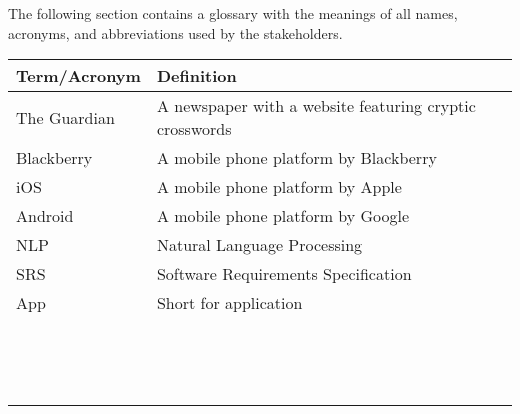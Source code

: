 
The following section contains a glossary with the meanings of all names, acronyms, and abbreviations used by the stakeholders.


\begin{table}[H]
\centering
\small
    \begin{tabular}{|l|l|}
    \hline
    \textbf{Term/Acronym}  & \textbf{Definition}                                                \\ \hline
    The Guardian  &  A newspaper with a website featuring cryptic  crosswords \\ \hline
    Blackberry    & A mobile phone platform by Blackberry                     \\ \hline
    iOS           & A mobile phone platform by Apple                          \\ \hline
    Android       & A mobile phone platform by  Google                        \\ \hline
    NLP           & Natural Language Processing                               \\ \hline
    SRS           & Software Requirements Specification                       \\ \hline
    App           & Short for application                                     \\ \hline
    ~             & ~                                                         \\ \hline
    ~             & ~                                                         \\ \hline
    ~             & ~                                                         \\ \hline
    \end{tabular}
\end{table}

